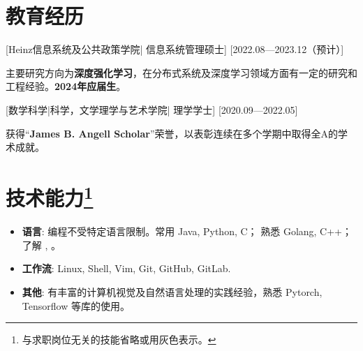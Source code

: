 \documentclass{resume}
\begin{document}


\ResumeTitle


\section{教育经历}
[\textnormal{Heinz信息系统及公共政策学院|}  信息系统管理硕士]
[2022.08—2023.12（预计）]

主要研究方向为\textbf{深度强化学习}，在分布式系统及深度学习领域方面有一定的研究和工程经验。\textbf{2024年应届生}。


[\textnormal{数学科学|科学，文学理学与艺术学院|} 理学学士]
[2020.09—2022.05]

获得“\textbf{James B. Angell Scholar}”荣誉，以表彰连续在多个学期中取得全A的学术成就。

\section[技术能力]{技术能力\protect\footnote{与求职岗位无关的技能省略或用灰色表示。}}
\begin{itemize}
  \item \textbf{语言}: 编程不受特定语言限制。常用 Java, Python, C； 熟悉 Golang, C++；了解 , 。
  \item \textbf{工作流}: Linux, Shell, Vim, Git, GitHub, GitLab.
  \item \textbf{其他}: 有丰富的计算机视觉及自然语言处理的实践经验，熟悉 Pytorch, Tensorflow 等库的使用。
\end{itemize}
\end{document}
